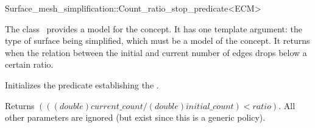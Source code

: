 

\begin{ccRefFunctionObjectClass}{Surface_mesh_simplification::Count_ratio_stop_predicate<ECM>}


\ccDefinition

The class \ccRefName\ provides a model for the  concept.
It has one template argument: the type of surface being simplified,
which must be a model of the  concept.
It returns  when the relation between the initial and current number 
of edges drops below a certain ratio.


\ccIsModel
{}

\ccCreation
{}  %

{Initializes the predicate establishing the .} 

\ccOperations
\ccTagFullDeclarations
{}  %

  {Returns $( ((double)current\_count / (double)initial\_count) < ratio)$. 
  All other parameters are ignored (but exist since this is a generic policy).}

\ccSeeAlso
{}

\end{ccRefFunctionObjectClass}


